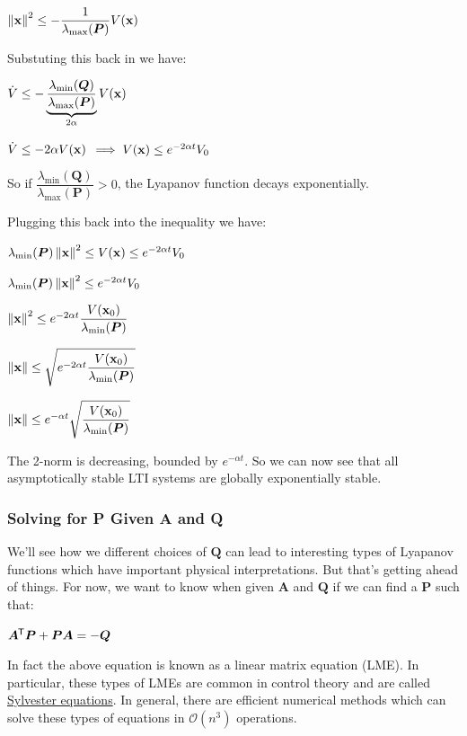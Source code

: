 \documentclass[11pt]{article}
\begin{document}
  \(\left\lVert\mathbf{x}\right\rVert^2 \le -\dfrac{1}{\lambda_{\textrm{max}}(\bm{P})} V(\mathbf{x})\)

  \vspace{12pt}

  Substuting this back in we have:

  \(\dot{V} \le -\underbrace{\dfrac{\lambda_{\textrm{min}}(\bm{Q})}{\lambda_{\textrm{max}}(\bm{P})}}_{2\alpha}V(\mathbf{x})\)

  \(\dot{V} \le -2\alpha V(\mathbf{x})\)
  \(\implies V(\mathbf{x}) \le e^{-2\alpha t}V_0\)

  So if \(\dfrac{\lambda_{\textrm{min}}(\bm{Q})}{\lambda_{\textrm{max}}(\bm{P})} > 0\), the Lyapanov function decays
  exponentially.

  \pagebreak

  Plugging this back into the inequality we have:

  \(\lambda_{\textrm{min}}(\bm{P})\left\lVert\mathbf{x}\right\rVert^2 \le V(\mathbf{x}) \le e^{-2\alpha t}V_0\)

  \(\lambda_{\textrm{min}}(\bm{P})\left\lVert\mathbf{x}\right\rVert^2 \le e^{-2\alpha t}V_0\)

  \(\left\lVert\mathbf{x}\right\rVert^2 \le e^{-2\alpha t}\dfrac{V(\mathbf{x}_0)}{\lambda_{\textrm{min}}(\bm{P})}\)

  \(\left\lVert\mathbf{x}\right\rVert \le \sqrt{e^{-2\alpha t}\dfrac{V(\mathbf{x}_0)}{\lambda_{\textrm{min}}(\bm{P})}}\)

  \(\left\lVert\mathbf{x}\right\rVert \le e^{-\alpha t}\sqrt{\dfrac{V(\mathbf{x}_0)}{\lambda_{\textrm{min}}(\bm{P})}}\)

  The 2-norm is decreasing, bounded by \(e^{-\alpha t}\). So we can now see that all asymptotically
  stable LTI systems are globally exponentially stable.

  \subsubsection{Solving for P Given A and Q}

  We'll see how we different choices of \(\bm{Q}\) can lead to interesting types of Lyapanov functions
  which have important physical interpretations. But that's getting ahead of things. For now, we
  want to know when given \(\bm{A}\) and \(\bm{Q}\) if we can find a \(\bm{P}\) such that:

  \(\bm{A}^{\mkern-1.5mu\mathsf{T}}\bm{P} + \bm{P}\bm{A} = -\bm{Q}\)

  In fact the above equation is known as a linear matrix equation (LME). In particular, these
  types of LMEs are common in control theory and are called
  \href{https://www.wikiwand.com/en/Sylvester_equation}{Sylvester equations}. In general,
  there are efficient numerical methods which can solve these types of equations in \(\mathcal{O}(n^3)\) operations.
\end{document}
